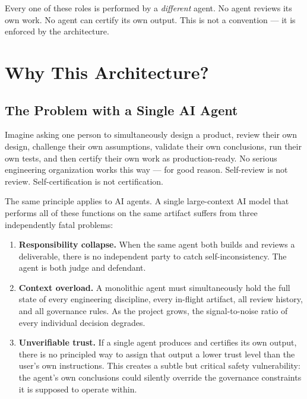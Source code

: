 \documentclass[12pt]{article}
\begin{document}
Every one of these roles is performed by a \emph{different} agent.
No agent reviews its own work.
No agent can certify its own output.
This is not a convention --- it is enforced by the architecture.

\section{Why This Architecture?}
\label{sec:why}

\subsection{The Problem with a Single AI Agent}

Imagine asking one person to simultaneously design a product, review
their own design, challenge their own assumptions, validate their own
conclusions, run their own tests, and then certify their own work as
production-ready.
No serious engineering organization works this way --- for good
reason.
Self-review is not review.
Self-certification is not certification.

The same principle applies to AI agents.
A single large-context AI model that performs all of these functions on
the same artifact suffers from three independently fatal problems:

\begin{enumerate}
    \item \textbf{Responsibility collapse.}
          When the same agent both builds and reviews a deliverable,
          there is no independent party to catch self-inconsistency.
          The agent is both judge and defendant.

    \item \textbf{Context overload.}
          A monolithic agent must simultaneously hold the full state
          of every engineering discipline, every in-flight artifact,
          all review history, and all governance rules.
          As the project grows, the signal-to-noise ratio of every
          individual decision degrades.

    \item \textbf{Unverifiable trust.}
          If a single agent produces and certifies its own output,
          there is no principled way to assign that output a lower
          trust level than the user's own instructions.
          This creates a subtle but critical safety vulnerability:
          the agent's own conclusions could silently override the
          governance constraints it is supposed to operate within.
\end{enumerate}
\end{document}
